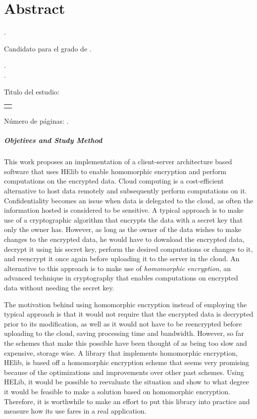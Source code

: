 \chapter{Abstract}

\noindent\autor.

\noindent Candidato para el grado de \grado.

\noindent\uanl.\\
\noindent\fime.

\noindent T\'{\i}tulo del estudio: 

\begin{center}
\begin{tabular}{p{11cm}}
	\centering
	\scshape{\large{\titulo}}
\end{tabular}
\end{center}\bigskip

\noindent N\'{u}mero de p\'{a}ginas: \pageref{LastPage}.

\paragraph{Objetives and Study Method}
This work proposes an implementation of a client-server architecture based software that uses HElib to enable homomorphic encryption and perform computations on the encrypted data. Cloud computing is a cost-efficient alternative to host data remotely and subsequently perform computations on it. Confidentiality becomes an issue when data is delegated to the cloud, as often the information hosted is considered to be sensitive. A typical approach is to make use of a cryptographic algorithm that encrypts the data with a secret key that only the owner has. However, as long as the owner of the data wishes to make changes to the encrypted data, he would have to download the encrypted data, decrypt it using his secret key, perform the desired computations or changes to it, and reencrypt it once again before uploading it to the server in the cloud. An alternative to this approach is to make use of \emph{homomorphic encryption}, an advanced technique in cryptography that enables computations on encrypted data without needing the secret key. 

The motivation behind using homomorphic encryption instead of employing the typical approach is that it would not require that the encrypted data is decrypted prior to its modification, as well as it would not have to be reencrypted before uploading to the cloud, saving processing time and bandwidth. However, so far the schemes that make this possible have been thought of as being too slow and expensive, storage wise. A library that implements homomorphic encryption, HElib, is based off a homomorphic encryption scheme that seems very promising because of the optimizations and improvements over other past schemes. Using HELib, it would be possible to reevaluate the situation and show to what degree it would be feasible to make a solution based on homomorphic encryption. Therefore, it is worthwhile to make an effort to put this library into practice and measure how its use fares in a real application.

